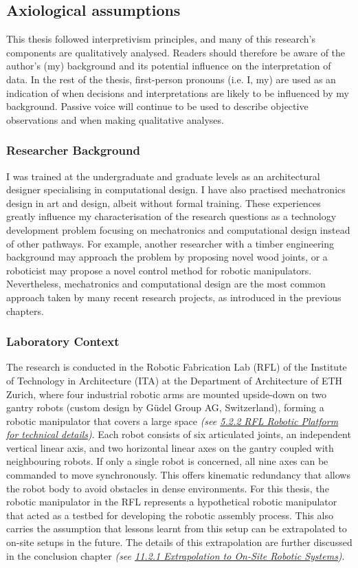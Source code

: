 \documentclass[11pt]{book}
\begin{document}
\subsection{Axiological assumptions}

This thesis followed interpretivism principles, and many of this research's components are qualitatively analysed. Readers should therefore be aware of the author’s (my) background and its potential influence on the interpretation of data. In the rest of the thesis, first-person pronouns (i.e. I, my) are used as an indication of when decisions and interpretations are likely to be influenced by my background. Passive voice will continue to be used to describe objective observations and when making qualitative analyses.

\subsubsection{Researcher Background}

I was trained at the undergraduate and graduate levels as an architectural designer specialising in computational design. I have also practised mechatronics design in art and design, albeit without formal training. These experiences greatly influence my characterisation of the research questions as a technology development problem focusing on mechatronics and computational design instead of other pathways. For example, another researcher with a timber engineering background may approach the problem by proposing novel wood joints, or a roboticist may propose a novel control method for robotic manipulators. Nevertheless, mechatronics and computational design are the most common approach taken by many recent research projects, as introduced in the previous chapters.

\subsubsection{Laboratory Context}

The research is conducted in the Robotic Fabrication Lab (RFL) of the Institute of Technology in Architecture (ITA) at the Department of Architecture of ETH Zurich, where four industrial robotic arms are mounted upside-down on two gantry robots (custom design by Güdel Group AG, Switzerland), forming a robotic manipulator that covers a large space\textit{ (see \uline{5.2.2 RFL Robotic Platform for technical details})}. Each robot consists of six articulated joints, an independent vertical linear axis, and two horizontal linear axes on the gantry coupled with neighbouring robots. If only a single robot is concerned, all nine axes can be commanded to move synchronously. This offers kinematic redundancy that allows the robot body to avoid obstacles in dense environments. For this thesis, the robotic manipulator in the RFL represents a hypothetical robotic manipulator that acted as a testbed for developing the robotic assembly process. This also carries the assumption that lessons learnt from this setup can be extrapolated to on-site setups in the future. The details of this extrapolation are further discussed in the conclusion chapter \textit{(see \uline{11.2.1 Extrapolation to On-Site Robotic Systems})}. 
\end{document}
